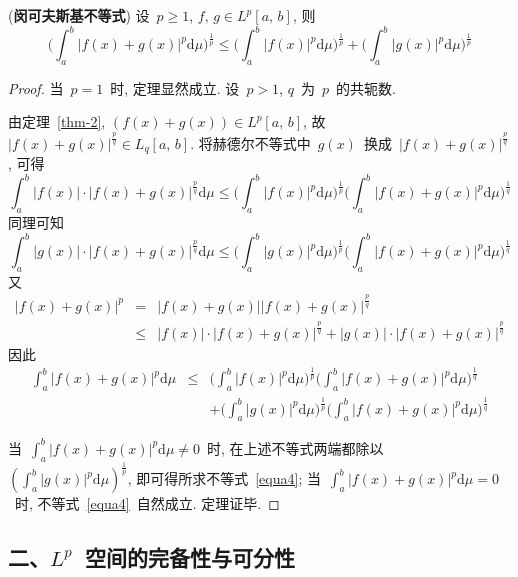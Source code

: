 \begin{Theorem}(\textbf{闵可夫斯基不等式})
设~$p\geqslant 1$, $f,\, g\in L^p[a,\,b]$, 则
\begin{equation}\label{equa4}
\Big(\int_{a}^{b}|f(x)+g(x)|^{p}\mathrm{d}\mu\Big)^{\frac{1}{p}}\leqslant \Big(\int_{a}^{b}|f(x)|^{p}\mathrm{d}\mu\Big)^{\frac{1}{p}}+\Big(\int_{a}^{b}|g(x)|^{p}\mathrm{d}\mu\Big)^{\frac{1}{p}}
\end{equation}
\end{Theorem}

\begin{proof}
当~$p=1$~时, 定理显然成立. 设~$p>1$, $q$~为~$p$~的共轭数.

由定理~\ref{thm-2}, $(f(x)+g(x))\in L^p[a,\,b]$, 故~$|f(x)+g(x)|^{\frac{p}{q}}\in L_{q}[a,\,b]$.
将赫德尔不等式中~$g(x)$~换成~$|f(x)+g(x)|^{\frac{p}{q}}$, 可得
\[ \int_{a}^{b}|f(x)|\cdot|f(x)+g(x)|^{\frac{p}{q}}\mathrm{d}\mu
\leqslant \Big(\int_{a}^{b}|f(x)|^{p}\mathrm{d}\mu\Big)^{\frac{1}{p}}\Big(\int_{a}^{b}|f(x)+g(x)|^{p}\mathrm{d}\mu\Big)^{\frac{1}{q}}
\]
同理可知
\[
\int_{a}^{b}|g(x)|\cdot|f(x)+g(x)|^{\frac{p}{q}}\mathrm{d}\mu
\leqslant \Big(\int_{a}^{b}|g(x)|^{p}\mathrm{d}\mu\Big)^{\frac{1}{p}}\Big(\int_{a}^{b}|f(x)+g(x)|^{p}\mathrm{d}\mu\Big)^{\frac{1}{q}}
\]
又
\begin{eqnarray*}
|f(x)+g(x)|^{p}&=&|f(x)+g(x)||f(x)+g(x)|^{\frac{p}{q}}\\
&\leqslant& |f(x)|\cdot|f(x)+g(x)|^{\frac{p}{q}}+|g(x)|\cdot|f(x)+g(x)|^{\frac{p}{q}}
\end{eqnarray*}
因此
\begin{eqnarray*}\label{equa5}
\int_{a}^{b}|f(x)+g(x)|^{p}\mathrm{d}\mu &\leqslant& \Big(\int_{a}^{b}|f(x)|^{p}\mathrm{d}\mu\Big)^{\frac{1}{p}}\Big(\int_{a}^{b}|f(x)+g(x)|^{p}\mathrm{d}\mu\Big)^{\frac{1}{q}}\\
&& + \Big(\int_{a}^{b}|g(x)|^{p}\mathrm{d}\mu\Big)^{\frac{1}{p}}\Big(\int_{a}^{b}|f(x)+g(x)|^{p}\mathrm{d}\mu\Big)^{\frac{1}{q}}
\end{eqnarray*}

当~$\int_{a}^{b}|f(x)+g(x)|^{p}\mathrm{d}\mu\neq 0$~时, 在上述不等式两端都除以
~$\left(\int_{a}^{b}|g(x)|^{p}\mathrm{d}\mu\right)^{\frac{1}{p}}$, 即可得所求不等式~\eqref{equa4}; 当~$\int_{a}^{b}|f(x)+g(x)|^{p}\mathrm{d}\mu=0$~时, 不等式~\eqref{equa4}~自然成立. 定理证毕.
\end{proof}


\subsection*{二、$L^p$~空间的完备性与可分性}

